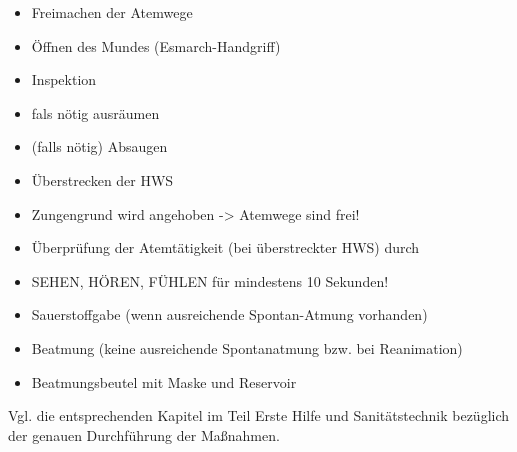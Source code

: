 \documentclass{article}
\begin{document}
\begin{itemize}
\item {\mdseries\color[rgb]{0.0,0.0,0.5019608}
Freimachen der Atemwege}

\end{itemize}
\begin{itemize}
\item {\mdseries\color[rgb]{0.0,0.0,0.5019608}
\"Offnen des Mundes (Esmarch-Handgriff)}

\item {\mdseries\color[rgb]{0.0,0.0,0.5019608}
Inspektion}

\item {\mdseries\color[rgb]{0.0,0.0,0.5019608}
fals n\"otig ausr\"aumen }

\item {\mdseries\color[rgb]{0.0,0.0,0.5019608}
(falls n\"otig) Absaugen}

\item {\mdseries\color[rgb]{0.0,0.0,0.5019608}
\"Uberstrecken der HWS}

\item {\mdseries\color[rgb]{0.0,0.0,0.5019608}
Zungengrund wird angehoben -{\textgreater} Atemwege  sind frei!}

\end{itemize}
\begin{itemize}
\item {\mdseries\color[rgb]{0.0,0.0,0.5019608}
\"Uberpr\"ufung der Atemt\"atigkeit (bei  \"uberstreckter HWS) durch}

\end{itemize}
\begin{itemize}
\item {\mdseries\color[rgb]{0.0,0.0,0.5019608}
SEHEN, H\"OREN, F\"UHLEN f\"ur mindestens 10  Sekunden!}

\end{itemize}
\begin{itemize}
\item {\mdseries\color[rgb]{0.0,0.0,0.5019608}
Sauerstoffgabe (wenn ausreichende Spontan-Atmung vorhanden)}

\item {\mdseries\color[rgb]{0.0,0.0,0.5019608}
Beatmung (keine ausreichende Spontanatmung bzw. bei Reanimation)}

\end{itemize}
\begin{itemize}
\item {\mdseries\color[rgb]{0.0,0.0,0.5019608}
Beatmungsbeutel mit Maske und Reservoir}

\end{itemize}
{\mdseries
Vgl. die entsprechenden Kapitel im Teil Erste Hilfe und
Sanit\"atstechnik bez\"uglich der genauen Durchf\"uhrung der
Ma{\ss}nahmen. }
\end{document}
